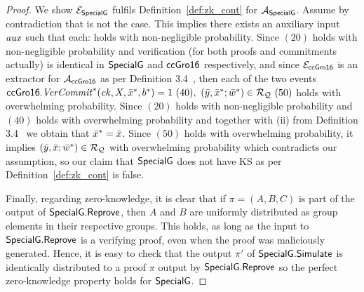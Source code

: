 \begin{proof}
\noindent We show $\mathcal{E}_{{\mathsf{SpecialG}}}$ fulfils Definition~\ref{def:zk_cont} for $\mathcal{A}_{{\mathsf{SpecialG}}}$. Assume by contradiction that is not the case. 
This implies there exists an auxiliary input $\mathit{aux}$ such that each: 
holds with non-negligible probability. Since $(20)$ holds with non-negligible probability and verification (for both proofs and commitments actually) is identical in ${\mathsf{SpecialG}}$ and ${\mathsf{ccGro16}}$ respectively, 
and since $\mathcal{E}_{{\mathsf{ccGro16}}}$ is an extractor for $\mathcal{A}_{{\mathsf{ccGro16}}}$ as per Definition 3.4~\cite{LegoSNARK},
 then each of the two events 
$\mathit{{\mathsf{ccGro16}}.\mathit{VerCommit}^*}(\mathit{ck}, X, \bar{x}^*, b^*) =1 \ (40), \ (\bar{y}, \bar{x}^*; \bar{w}^*) \in  \mathcal{R}_{\mathcal{Q}} \ (50)
$
 holds with overwhelming probability. Since $(20)$ holds with non-negligible probability and $(40)$ holds with overwhelming probability and 
together with (ii) from Definition 3.4~\cite{LegoSNARK} we obtain that $\bar{x}^* = \bar{x}$. Since $(50)$ holds with overwhelming probability, it implies 
$(\bar{y}, \bar{x}; \bar{w}^*) \in \mathcal{R}_{\mathcal{Q}} $ with overwhelming probability which contradicts our assumption, so our claim that ${\mathsf{SpecialG}}$ does not have 
KS as per Definition~\ref{def:zk_cont} is false. 

Finally, regarding zero-knowledge, it is clear that if $\pi = (A, B, C)$ is part of the output of ${\mathsf{SpecialG}}.{\mathsf{Reprove}}$, 
then $A$ and $B$ are uniformly distributed as group elements in their respective groups. This holds, as long as the input to ${\mathsf{SpecialG}}.{\mathsf{Reprove}}$ is a verifying proof, even when the proof was maliciously generated. Hence, it is easy to check  
that the output $\pi'$ of ${\mathsf{SpecialG}}.{\mathsf{Simulate}}$ is identically distributed to a proof $\pi$ output by ${\mathsf{SpecialG}}.{\mathsf{Reprove}}$ so the perfect 
zero-knowledge property holds for ${\mathsf{SpecialG}}$. 
\end{proof}




